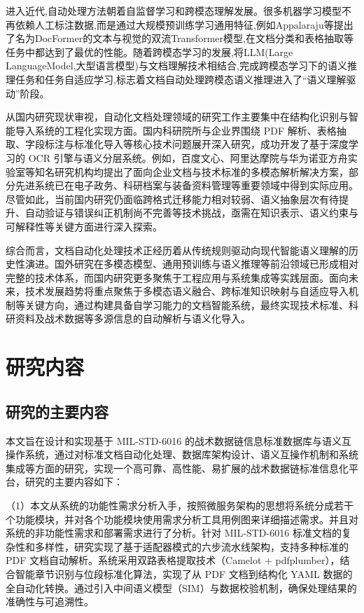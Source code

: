 进入近代,自动处理方法朝着自监督学习和跨模态理解发展。很多机器学习模型不再依赖人工标注数据,而是通过大规模预训练学习通用特征,例如Appalaraju等提出了名为DocFormer的文本与视觉的双流Transformer模型\cite{Appalaraju2021DocFormer},在文档分类和表格抽取等任务中都达到了最优的性能。随着跨模态学习的发展,将LLM(Large LanguageModel,大型语言模型)与文档理解技术相结合,完成跨模态学习下的语义推理任务和任务自适应学习\cite{Wang2023DocumentLLM},标志着文档自动处理跨模态语义推理进入了“语义理解驱动”阶段。

从国内研究现状审视，自动化文档处理领域的研究工作主要集中在结构化识别与智能导入系统的工程化实现方面。国内科研院所与企业界围绕 PDF 解析、表格抽取、字段标注与标准化导入等核心技术问题展开深入研究，成功开发了基于深度学习的 OCR 引擎与语义分层系统。例如，百度文心、阿里达摩院与华为诺亚方舟实验室等知名研究机构均提出了面向企业文档与技术标准的多模态解析解决方案，部分先进系统已在电子政务、科研档案与装备资料管理等重要领域中得到实际应用。尽管如此，当前国内研究仍面临跨格式迁移能力相对较弱、语义抽象层次有待提升、自动验证与错误纠正机制尚不完善等技术挑战，亟需在知识表示、语义约束与可解释性等关键方面进行深入探索。

综合而言，文档自动化处理技术正经历着从传统规则驱动向现代智能语义理解的历史性演进。国外研究在多模态模型、通用预训练与语义推理等前沿领域已形成相对完整的技术体系，而国内研究更多聚焦于工程应用与系统集成等实践层面。面向未来，技术发展趋势将重点聚焦于多模态语义融合、跨标准知识映射与自适应导入机制等关键方向，通过构建具备自学习能力的文档智能系统，最终实现技术标准、科研资料及战术数据等多源信息的自动解析与语义化导入。




\section{研究内容}

\subsection{研究的主要内容}

本文旨在设计和实现基于 MIL-STD-6016 的战术数据链信息标准数据库与语义互操作系统，通过对标准文档自动化处理、数据库架构设计、语义互操作机制和系统集成等方面的研究，实现一个高可靠、高性能、易扩展的战术数据链标准信息化平台，研究的主要内容如下：

（1）本文从系统的功能性需求分析入手，按照微服务架构的思想将系统分成若干个功能模块，并对各个功能模块使用需求分析工具用例图来详细描述需求。并且对系统的非功能性需求和部署需求进行了分析。针对 MIL-STD-6016 标准文档的复杂性和多样性，研究实现了基于适配器模式的六步流水线架构，支持多种标准的 PDF 文档自动解析\cite{MIL_STD_6016_Active_2024,MITRE_Link16_Interoperability_2024}。系统采用双路表格提取技术（Camelot + pdfplumber），结合智能章节识别与位段标准化算法，实现了从 PDF 文档到结构化 YAML 数据的全自动化转换。通过引入中间语义模型（SIM）与数据校验机制，确保处理结果的准确性与可追溯性。

